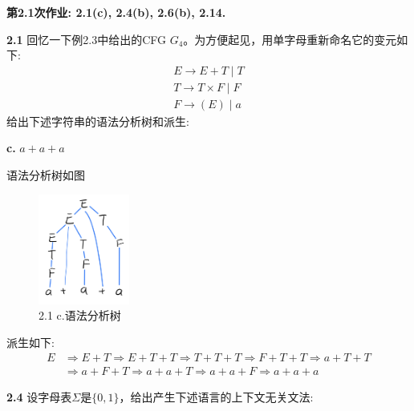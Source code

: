 \documentclass[UTF8]{report}
\newcommand{\problem}[1]{{\setlength{\parskip}{10pt}\noindent \bf{#1}}}
\newenvironment{solution}{{\noindent\hskip 2em \bf 解 \quad}}{}
\begin{document}

\maketitle



\textbf{第2.1次作业: 2.1(c), 2.4(b), 2.6(b), 2.14.}

\problem{2.1} 回忆一下例2.3中给出的CFG $G_4$。为方便起见，用单字母重新命名它的变元如下:
\begin{gather*}
    E \rightarrow E+T       \mid T\\
    T \rightarrow T\times F \mid F\\
    F \rightarrow (E) \mid a
\end{gather*}
给出下述字符串的语法分析树和派生:

\problem{c.} $a+a+a$

\begin{solution}
    语法分析树如图
    \begin{figure}[!htbp]
        \centering
        \includegraphics[width=3cm]{image/2.1.png}
        \caption{2.1 c.语法分析树}
        \label{fig:2_1}
    \end{figure}
    派生如下:
    \begin{align*}
        E &\Rightarrow E+T \Rightarrow E+T+T \Rightarrow T+T+T \Rightarrow F+T+T \Rightarrow a+T+T \\
        &\Rightarrow a+F+T \Rightarrow a+a+T \Rightarrow a+a+F \Rightarrow a+a+a
    \end{align*}
\end{solution}


\problem{2.4} 设字母表$\Sigma$是$\{0,1\}$，给出产生下述语言的上下文无关文法:
\end{document}
